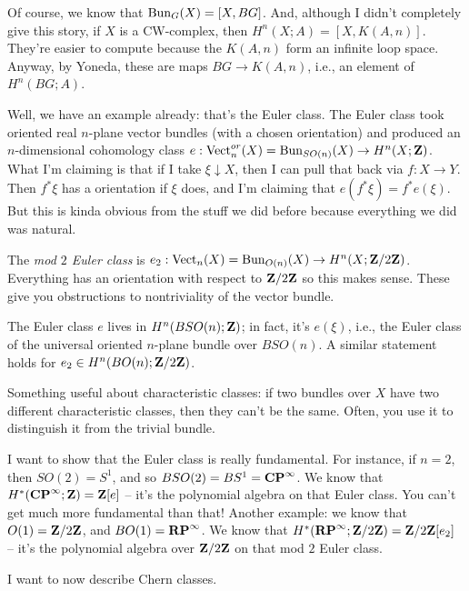 Of course, we know that $\mathrm{Bun}_G(X) = [X,BG]$.
And, although I didn't completely give this story, if $X$ is a CW-complex, then $H^n(X;A) = [X,K(A,n)]$.
They're easier to compute because the $K(A,n)$ form an infinite loop space.
Anyway, by Yoneda, these are maps $BG\to K(A,n)$, i.e., an element of $H^n(BG;A)$.

Well, we have an example already: that's the Euler class.
The Euler class took oriented real $n$-plane vector bundles (with a chosen orientation) and produced an $n$-dimensional cohomology class $e:\operatorname{Vect}^{or}_n(X) = \mathrm{Bun}_{SO(n)}(X)\to H^n(X;\mathbf Z)$.
What I'm claiming is that if I take $\xi\downarrow X$, then I can pull that back via $f:X \to Y$.
Then $f^\ast\xi$ has a orientation if $\xi$ does, and I'm claiming that $e(f^\ast\xi) = f^\ast e(\xi)$.
But this is kinda obvious from the stuff we did before because everything we did was natural.

The \emph{mod $2$ Euler class} is $e_2:\operatorname{Vect}_n(X) = \mathrm{Bun}_{O(n)}(X) \to H^n(X;\mathbf Z/2\mathbf Z)$.
Everything has an orientation with respect to $\mathbf Z/2\mathbf Z$ so this makes sense.
These give you obstructions to nontriviality of the vector bundle.

The Euler class $e$ lives in $H^n(BSO(n);\mathbf Z)$; in fact, it's $e(\xi)$, i.e., the Euler class of the universal oriented $n$-plane bundle over $BSO(n)$. A similar statement holds for $e_2\in H^n(BO(n);\mathbf Z/2\mathbf Z)$.

Something useful about characteristic classes:
if two bundles over $X$ have two different characteristic classes, then they can't be the same.
Often, you use it to distinguish it from the trivial bundle.

I want to show that the Euler class is really fundamental.
For instance, if $n=2$, then $SO(2) = S^1$, and so $BSO(2) = BS^1 = \mathbf{CP}^\infty$.
We know that $H^\ast(\mathbf{CP}^\infty;\mathbf Z) = \mathbf Z[e]$ -- it's the polynomial algebra on that Euler class.
You can't get much more fundamental than that!
Another example: we know that $O(1) = \mathbf Z/2\mathbf Z$, and $BO(1) = \mathbf{RP}^\infty$.
We know that $H^\ast(\mathbf{RP}^\infty;\mathbf Z/2\mathbf Z) = \mathbf Z/2\mathbf Z[e_2]$ -- it's the polynomial algebra over $\mathbf Z/2\mathbf Z$ on that mod $2$ Euler class.

I want to now describe Chern classes.
